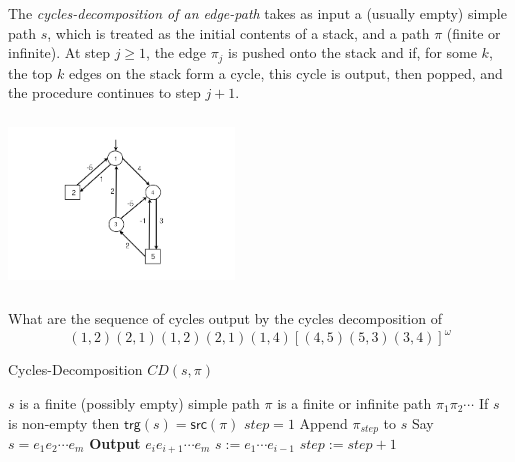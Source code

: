 \documentclass[a4paper,10pt]{article}
\begin{document}
\def\src{\textsf{src}}
\def\trg{\textsf{trg}}


The \emph{cycles-decomposition of an edge-path} takes as input
a (usually empty) simple path $s$, which is treated as the initial contents of a stack, and a path $\pi$ (finite or infinite).
At step $j \geq 1$, the edge $\pi_j$ is pushed onto the stack and if, for some $k$, the top $k$ edges on the stack form a cycle, this cycle is output, then popped, and the procedure continues to step $j+1$.

 \begin{center}\includegraphics[width=6cm,height=4.6cm]{mpg.png} \end{center}

\begin{example}
What are the sequence of cycles output by the cycles decomposition of 
\[ (1,2)(2,1)(1,2)(2,1)(1,4)[(4,5)(5,3)(3,4)]^\omega\]
\end{example}

\begin{algorithm}[htb]
\caption{Cycles-Decomposition $CD(s,\pi)$}
\label{alg:CD}
\begin{algorithmic}
\Require $s$ is a finite (possibly empty) simple path               
\Require $\pi$ is a finite or infinite path $\pi_1 \pi_2 \cdots$    
\Require If $s$ is non-empty then $\trg(s) = \src(\pi)$                
\State $ step = 1$
 								
\State Append $\pi_{step}$ to $s$						
\State Say $s = e_1 e_2 \cdots e_m$
			
\State \textbf{Output} $e_i e_{i+1} \cdots e_m$             
\State $s := e_1 \cdots e_{i-1}$ 										
\EndIf
\State $ step :=  step + 1$                                 
\EndWhile
\end{algorithmic}
\end{algorithm}
\end{document}
